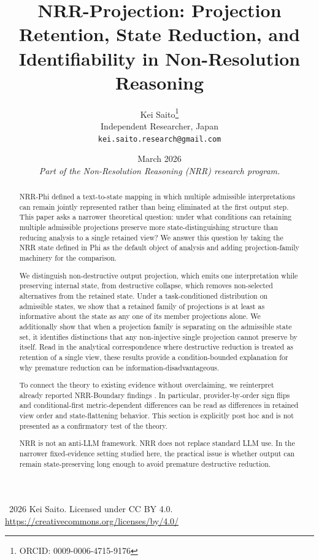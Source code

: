 \documentclass[11pt,a4paper]{article}
\title{\textbf{NRR-Projection: Projection Retention, State Reduction, and Identifiability in Non-Resolution Reasoning}}
\author{
  Kei Saito\thanks{ORCID: 0009-0006-4715-9176} \\
  Independent Researcher, Japan \\
  \texttt{kei.saito.research@gmail.com}
}
\date{March 2026 \\[0.5em]
\textit{Part of the Non-Resolution Reasoning (NRR) research program.}}
\begin{document}
\maketitle

\begin{center}
\textcopyright\ 2026 Kei Saito.
Licensed under CC BY 4.0.\\
\url{https://creativecommons.org/licenses/by/4.0/}
\end{center}

\begin{abstract}
NRR-Phi \cite{saito2026phi} defined a text-to-state mapping in which multiple admissible interpretations can remain jointly represented rather than being eliminated at the first output step. This paper asks a narrower theoretical question: under what conditions can retaining multiple admissible projections preserve more state-distinguishing structure than reducing analysis to a single retained view? We answer this question by taking the NRR state defined in Phi as the default object of analysis and adding projection-family machinery for the comparison.

We distinguish non-destructive output projection, which emits one interpretation while preserving internal state, from destructive collapse, which removes non-selected alternatives from the retained state. Under a task-conditioned distribution on admissible states, we show that a retained family of projections is at least as informative about the state as any one of its member projections alone. We additionally show that when a projection family is separating on the admissible state set, it identifies distinctions that any non-injective single projection cannot preserve by itself. Read in the analytical correspondence where destructive reduction is treated as retention of a single view, these results provide a condition-bounded explanation for why premature reduction can be information-disadvantageous.

To connect the theory to existing evidence without overclaiming, we reinterpret already reported NRR-Boundary findings \cite{saito2026boundary}. In particular, provider-by-order sign flips and conditional-first metric-dependent differences can be read as differences in retained view order and state-flattening behavior. This section is explicitly post hoc and is not presented as a confirmatory test of the theory.

NRR is not an anti-LLM framework. NRR does not replace standard LLM use. In the narrower fixed-evidence setting studied here, the practical issue is whether output can remain state-preserving long enough to avoid premature destructive reduction.
\end{abstract}
\end{document}
